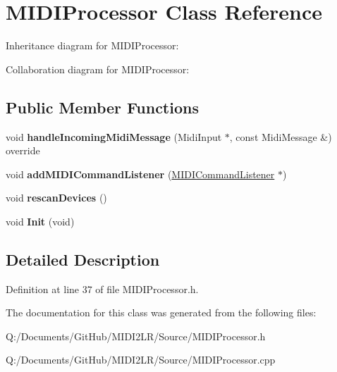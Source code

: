 \hypertarget{class_m_i_d_i_processor}{}\section{M\+I\+D\+I\+Processor Class Reference}
\label{class_m_i_d_i_processor}


Inheritance diagram for M\+I\+D\+I\+Processor\+:


Collaboration diagram for M\+I\+D\+I\+Processor\+:
\subsection*{Public Member Functions}
\begin{DoxyCompactItemize}
\item 
void {\bfseries handle\+Incoming\+Midi\+Message} (Midi\+Input $\ast$, const Midi\+Message \&) override\hypertarget{class_m_i_d_i_processor_a373aab7c369e94b1f1a59ca78f78111e}{}\label{class_m_i_d_i_processor_a373aab7c369e94b1f1a59ca78f78111e}

\item 
void {\bfseries add\+M\+I\+D\+I\+Command\+Listener} (\hyperlink{class_m_i_d_i_command_listener}{M\+I\+D\+I\+Command\+Listener} $\ast$)\hypertarget{class_m_i_d_i_processor_a9b05cdfb5dc81f134ae7d88873b44ade}{}\label{class_m_i_d_i_processor_a9b05cdfb5dc81f134ae7d88873b44ade}

\item 
void {\bfseries rescan\+Devices} ()\hypertarget{class_m_i_d_i_processor_a9b05a1d09a8cff97d6b158cb4270f2e7}{}\label{class_m_i_d_i_processor_a9b05a1d09a8cff97d6b158cb4270f2e7}

\item 
void {\bfseries Init} (void)\hypertarget{class_m_i_d_i_processor_a5368c02640c7493c0119deadfe2feeba}{}\label{class_m_i_d_i_processor_a5368c02640c7493c0119deadfe2feeba}

\end{DoxyCompactItemize}


\subsection{Detailed Description}


Definition at line 37 of file M\+I\+D\+I\+Processor.\+h.



The documentation for this class was generated from the following files\+:\begin{DoxyCompactItemize}
\item 
Q\+:/\+Documents/\+Git\+Hub/\+M\+I\+D\+I2\+L\+R/\+Source/M\+I\+D\+I\+Processor.\+h\item 
Q\+:/\+Documents/\+Git\+Hub/\+M\+I\+D\+I2\+L\+R/\+Source/M\+I\+D\+I\+Processor.\+cpp\end{DoxyCompactItemize}
